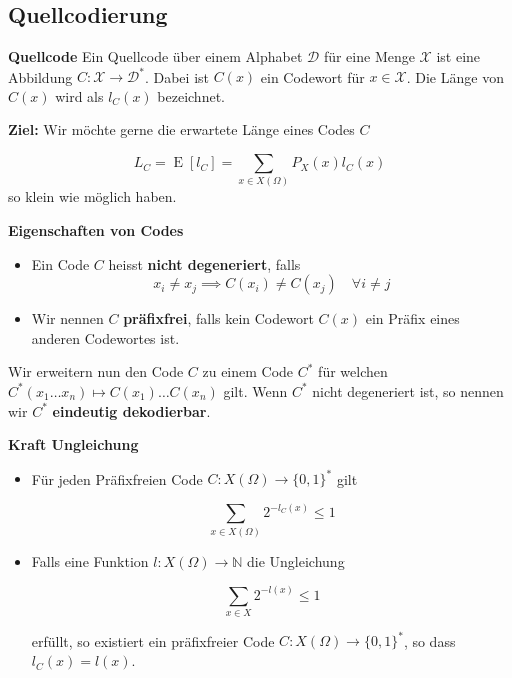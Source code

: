 \documentclass[25pt]{sciposter}
\newcommand{\N}{\mathbb{N}}
\newcommand{\E}{\operatorname{E}}
\newenvironment{defn}[1]{\begin{mdframed}[backgroundcolor=blue!10,innertopmargin=15pt, nobreak=true,innerbottommargin=15pt]
		\textbf{#1 }
	}
	{ 
	\end{mdframed}
}
\newenvironment{thm}[1]{\begin{mdframed}[nobreak=true,backgroundcolor=Emerald!10,innertopmargin=15pt, innerbottommargin=15pt]
		\textbf{#1 }
	}
	{ 
	\end{mdframed}
}
\begin{document}
\begin{multicols}{3}
\section{Quellcodierung}


\begin{defn}{Quellcode} Ein Quellcode über einem Alphabet $\mathcal{D}$ für eine Menge $\mathcal{X}$ ist eine Abbildung $C:\mathcal{X} \to \mathcal{D}^*$. Dabei ist $C(x)$ ein Codewort für $x\in \mathcal{X}$. Die Länge von $C(x)$ wird als $l_C(x)$ bezeichnet.
\end{defn}

\textbf{Ziel:} Wir möchte gerne die erwartete Länge eines Codes $C$

\begin{equation*}
L_C = \E[l_C] = \sum_{x\in X(\Omega)} P_X(x) l_C(x)
\end{equation*}
so klein wie möglich haben.




\begin{defn}{Eigenschaften von Codes}
	\begin{itemize}
		\item Ein Code $C$ heisst \textbf{nicht degeneriert}, falls $$x_i \neq x_j \implies C(x_i) \neq C(x_j) \quad \forall i\neq j$$
		\item Wir nennen $C$ \textbf{präfixfrei}, falls kein Codewort $C(x)$ ein Präfix eines anderen Codewortes ist.
	\end{itemize}
\end{defn}

Wir erweitern nun den Code $C$ zu einem Code $C^*$ für welchen $C^*(x_1 \ldots x_n) \mapsto C(x_1)\ldots C(x_n)$ gilt. Wenn $C^*$ nicht degeneriert ist, so nennen wir $C^*$ \textbf{eindeutig dekodierbar}.

\begin{thm}{Kraft Ungleichung}
\begin{itemize}
	\item Für jeden Präfixfreien Code $C:{X}(\Omega)\to \{0,1\}^*$ gilt 
	
	$$\sum_{x \in X(\Omega)} 2^{-l_C(x)} \leq 1$$
	
	\item Falls eine Funktion $l:X(\Omega)\to\N$ die Ungleichung
	
	$$\sum_{x\in X} 2^{-l(x)} \leq 1$$
	
	erfüllt, so existiert ein präfixfreier Code $C:X(\Omega) \to \{0,1\}^*$, so dass $l_C(x) = l(x)$.
\end{itemize}
\end{thm}


\end{multicols}
\end{document}

